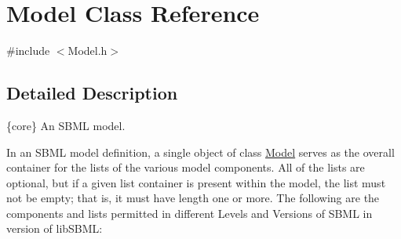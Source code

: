 \hypertarget{class_model}{}\section{Model Class Reference}
\label{class_model}


{\ttfamily \#include $<$Model.\+h$>$}



\subsection{Detailed Description}
\{core\} An S\+B\+ML model.

In an S\+B\+ML model definition, a single object of class \hyperlink{class_model}{Model} serves as the overall container for the lists of the various model components. All of the lists are optional, but if a given list container is present within the model, the list must not be empty; that is, it must have length one or more. The following are the components and lists permitted in different Levels and Versions of S\+B\+ML in version  of lib\+S\+B\+ML\+: 
